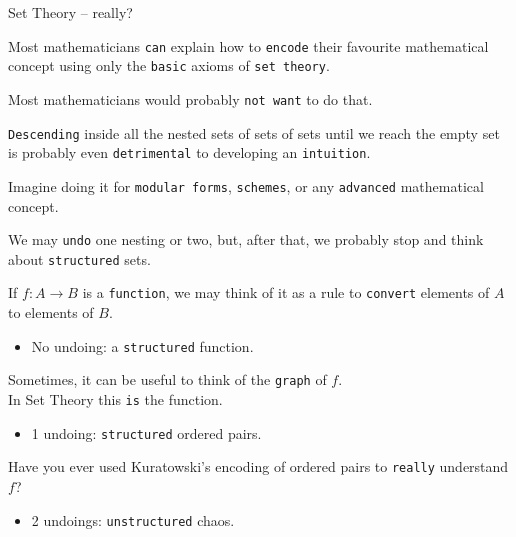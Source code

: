 \documentclass{beamer}
\begin{document}
\begin{frame}[fragile]{Set Theory -- really?}

Most mathematicians {\color{violet}\verb`can`} explain how to {\color{violet}\verb`encode`} their favourite mathematical concept using only the {\color{violet}\verb`basic`} axioms of {\color{violet}\verb`set theory`}.

Most mathematicians would probably {\color{violet}\verb`not want`} to do that.

{\color{violet}\verb`Descending`} inside all the nested sets of sets of sets until we reach the empty set is probably even {\color{violet}\verb`detrimental`} to developing an {\color{violet}\verb`intuition`}.

Imagine doing it for {\color{violet}\verb`modular forms`}, {\color{violet}\verb`schemes`}, or any {\color{violet}\verb`advanced`} mathematical concept.
\end{frame}

\begin{frame}[fragile]

We may {\color{violet}\verb`undo`} one nesting or two, but, after that, we probably stop and think about {\color{violet}\verb`structured`} sets.

If $f \colon A \longrightarrow B$ is a {\color{violet}\verb`function`}, we may think of it as a rule to {\color{violet}\verb`convert`} elements of $A$ to elements of $B$.
\vspace{-13pt}
\begin{itemize}
\setlength\itemsep{-12pt}
\item
  No undoing: a {\color{violet}\verb`structured`} function.
\end{itemize}

Sometimes, it can be useful to think of the {\color{violet}\verb`graph`} of $f$.
\\
In Set Theory this {\color{violet}\verb`is`} the function.
\vspace{-13pt}
\begin{itemize}
\setlength\itemsep{-12pt}
\item
  1 undoing: {\color{violet}\verb`structured`} ordered pairs.
\end{itemize}

Have you ever used Kuratowski's encoding of ordered pairs to {\color{violet}\verb`really`} understand $f$?
\vspace{-13pt}
\begin{itemize}
\setlength\itemsep{-12pt}
\item
  2 undoings: {\color{violet}\verb`unstructured`} chaos.
\end{itemize}
\end{frame}
\end{document}
